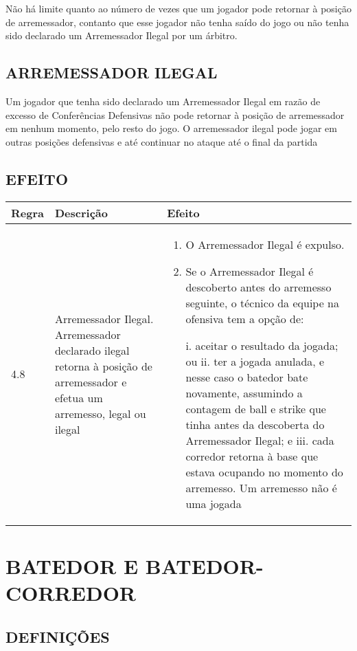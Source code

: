 Não há limite quanto ao número de vezes que um jogador pode retornar à posição de arremessador, contanto que esse jogador não tenha saído do jogo ou não tenha sido declarado um Arremessador Ilegal por um árbitro.

\section{ARREMESSADOR ILEGAL}
Um jogador que tenha sido declarado um Arremessador Ilegal em razão de excesso de Conferências Defensivas não pode retornar à posição de arremessador em nenhum momento, pelo resto do jogo. O arremessador ilegal pode jogar em outras posições defensivas e até continuar no ataque até o final da partida

\section*{EFEITO}

{\footnotesize\begin{tabular}{p{15mm}p{60mm}p{90mm}}
		Regra& Descrição & Efeito\\\hline
		4.8 & Arremessador Ilegal. Arremessador declarado ilegal retorna à posição de arremessador e efetua um arremesso, legal ou ilegal

		&
		\begin{enumerate}[label=(\alph*)]\item   O Arremessador Ilegal é expulso.
			\item  Se o Arremessador Ilegal é descoberto antes do arremesso seguinte, o	técnico da equipe na ofensiva tem a opção de:

			i. aceitar o resultado da jogada; ou
			ii. ter a jogada anulada, e nesse caso o batedor bate novamente, assumindo a
			contagem de \gls{ball} e \gls{strike} que tinha antes da descoberta do Arremessador
			Ilegal; e
			iii. cada corredor retorna à base que estava ocupando no momento do arremesso. Um arremesso não é uma jogada

		\end{enumerate}
\end{tabular}}

\chapter{BATEDOR E BATEDOR-CORREDOR}
\minitoc%

\section{DEFINIÇÕES}

